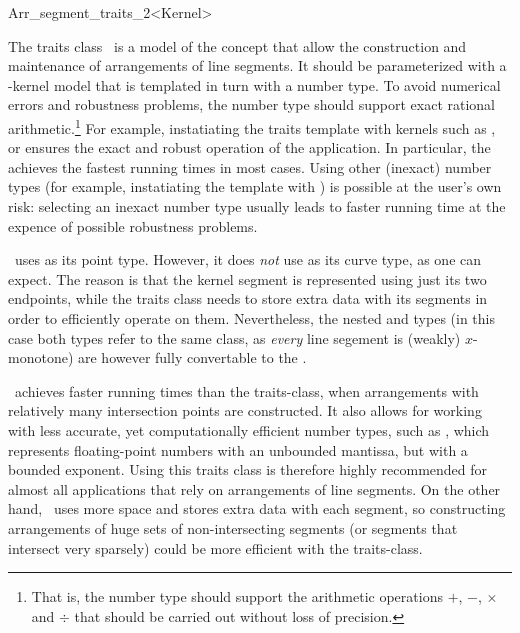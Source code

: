 
\ccRefPageBegin

\begin{ccRefClass}{Arr_segment_traits_2<Kernel>}
    
\ccDefinition 

The traits class \ccRefName\ is a model of the 
concept that allow the construction and maintenance of arrangements of
line segments. It should be parameterized with a \cgal-kernel model that is
templated in turn with a number type. To avoid numerical errors and
robustness problems, the number type should support exact rational
arithmetic.\footnote{That is, the number type should support the arithmetic
operations $+$, $-$, $\times$ and $\div$ that should be carried out
without loss of precision.} For example, instatiating the traits
template with kernels such as ,
or  ensures the exact and robust operation of
the application. In particular, the  achieves
the fastest running times in most cases. Using other (inexact) number
types (for example, instatiating the template with
) is possible at the user's own risk:
selecting an inexact number type usually leads to faster running time at
the expence of possible robustness problems.

\ccRefName\ uses  as its point type. However, it
does {\sl not} use  as its curve type, as one can
expect. The reason is that the kernel segment is represented using just
its two endpoints, while the traits class needs to store extra data with
its segments in order to efficiently operate on them. Nevertheless, the
nested  and  types (in this case both
types refer to the same class, as {\sl every} line segement is (weakly)
$x$-monotone) are however fully convertable to the .

\ccRefName\ achieves faster running times than the
 traits-class, when
arrangements with relatively many intersection points are constructed.
It also allows for working with less accurate, yet computationally
efficient number types, such as , which
represents floating-point numbers with an unbounded mantissa, but with
a bounded exponent. Using this traits class is therefore highly recommended
for almost all applications that rely on arrangements of line segments.
On the other hand, \ccRefName\  uses more space and stores extra data with
each segment, so constructing arrangements of huge sets of non-intersecting
segments (or segments that intersect very sparsely) could be more efficient
with the  traits-class.


\end{ccRefClass}
